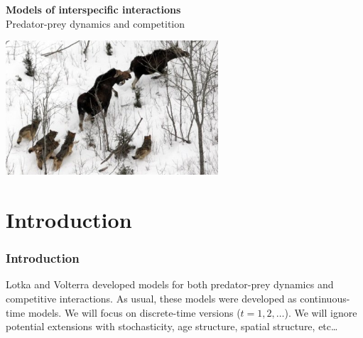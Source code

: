 \documentclass[color=usenames,dvipsnames]{beamer}\usepackage[]{graphicx}\usepackage[]{xcolor}
\begin{document}
\begin{frame}[plain]
  \begin{center}
    {\LARGE {\color{Black} \bf Models of interspecific interactions} \\
      \LARGE {\color{Black} Predator-prey dynamics and
        competition} \par}
    \vspace{0.5cm}
    \vfill
      \includegraphics[height=5cm,keepaspectratio]{figs/isle-royale1} \\
  \end{center}
\end{frame}




\section{Introduction}




\begin{frame}
  \frametitle{Introduction}
  \large
  Lotka and Volterra developed models for both predator-prey
      dynamics and competitive interactions.
      \pause \vfill
  As usual, these models were developed as
      continuous-time models.
      \pause \vfill
  We will focus on discrete-time versions ($t = 1, 2, \ldots$).
      \pause \vfill
  We will ignore potential extensions with stochasticity, age
      structure, spatial structure, etc\dots
\end{frame}
\end{document}
